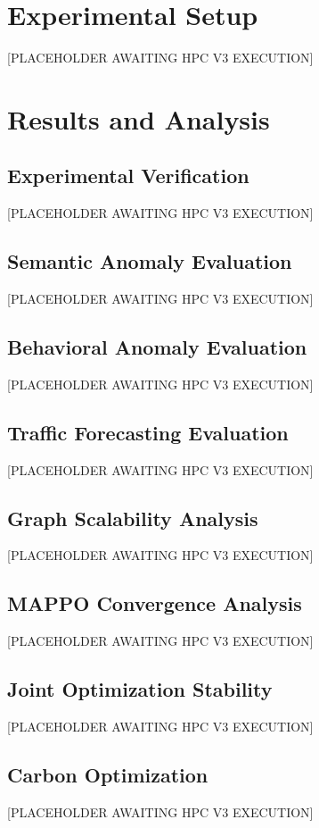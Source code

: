 \documentclass{ieeeaccess}
\begin{document}
\section{Experimental Setup}
\label{sec:experimental_setup}
[PLACEHOLDER AWAITING HPC V3 EXECUTION]

\section{Results and Analysis}
\label{sec:results}

\subsection{Experimental Verification}
[PLACEHOLDER AWAITING HPC V3 EXECUTION]

\subsection{Semantic Anomaly Evaluation}
[PLACEHOLDER AWAITING HPC V3 EXECUTION]

\subsection{Behavioral Anomaly Evaluation}
[PLACEHOLDER AWAITING HPC V3 EXECUTION]

\subsection{Traffic Forecasting Evaluation}
[PLACEHOLDER AWAITING HPC V3 EXECUTION]

\subsection{Graph Scalability Analysis}
[PLACEHOLDER AWAITING HPC V3 EXECUTION]

\subsection{MAPPO Convergence Analysis}
[PLACEHOLDER AWAITING HPC V3 EXECUTION]

\subsection{Joint Optimization Stability}
[PLACEHOLDER AWAITING HPC V3 EXECUTION]

\subsection{Carbon Optimization}
[PLACEHOLDER AWAITING HPC V3 EXECUTION]
\end{document}
